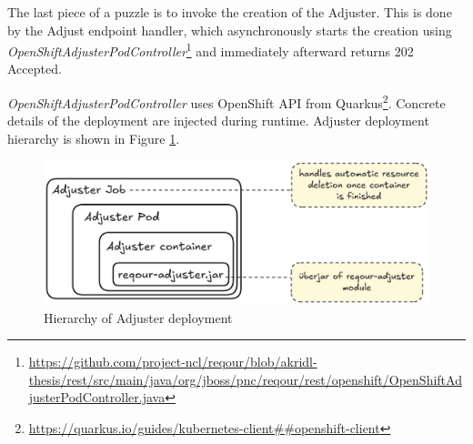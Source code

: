 \documentclass[../main.tex]{subfiles}
\begin{document}
The last piece of a puzzle is to invoke the creation of the Adjuster. This is done by the Adjust endpoint handler, which asynchronously starts the creation using \textit{OpenShiftAdjusterPodController}\footnote{\url{https://github.com/project-ncl/reqour/blob/akridl-thesis/rest/src/main/java/org/jboss/pnc/reqour/rest/openshift/OpenShiftAdjusterPodController.java}}  and immediately afterward returns 202 Accepted.

\textit{OpenShiftAdjusterPodController} uses OpenShift API from Quarkus\footnote{\url{https://quarkus.io/guides/kubernetes-client##openshift-client}}. Concrete details of the deployment are injected during runtime. Adjuster deployment hierarchy is shown in Figure \ref{fig:adjuster-deployment}.

\begin{figure}
  \begin{center}
    \includegraphics[width=\textwidth]{images/adjuster-deployment.png}
  \end{center}
  \caption{Hierarchy of Adjuster deployment}
  \label{fig:adjuster-deployment}
\end{figure}
\end{document}
